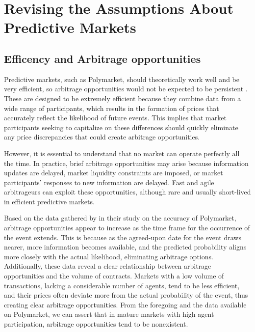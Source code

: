 \section{Revising the Assumptions About Predictive Markets}
\label{sec:revising_assumptions}

\subsection{Efficency and Arbitrage opportunities}
\label{subsec:efficency_and_arbitrage_opportunities}

Predictive markets, such as Polymarket, should theoretically work well and be very efficient, so arbitrage opportunities would not be expected to be persistent \parencite{luckner2008arbitrage}. These are designed to be extremely efficient because they combine data from a wide range of participants, which results in the formation of prices that accurately reflect the likelihood of future events. This implies that market participants seeking to capitalize on these differences should quickly eliminate any price discrepancies that could create arbitrage opportunities.

However, it is essential to understand that no market can operate perfectly all the time. In practice, brief arbitrage opportunities may arise because information updates are delayed, market liquidity constraints are imposed, or market participants' responses to new information are delayed. Fast and agile arbitrageurs can exploit these opportunities, although rare and usually short-lived in efficient predictive markets.

Based on the data gathered by \cite{kapp2023improved} in their study on the accuracy of Polymarket, arbitrage opportunities appear to increase as the time frame for the occurrence of the event extends. This is because as the agreed-upon date for the event draws nearer, more information becomes available, and the predicted probability aligns more closely with the actual likelihood, eliminating arbitrage options. Additionally, these data reveal a clear relationship between arbitrage opportunities and the volume of contracts. Markets with a low volume of transactions, lacking a considerable number of agents, tend to be less efficient, and their prices often deviate more from the actual probability of the event, thus creating clear arbitrage opportunities. From the foregoing and the data available on Polymarket, we can assert that in mature markets with high agent participation, arbitrage opportunities tend to be nonexistent.

